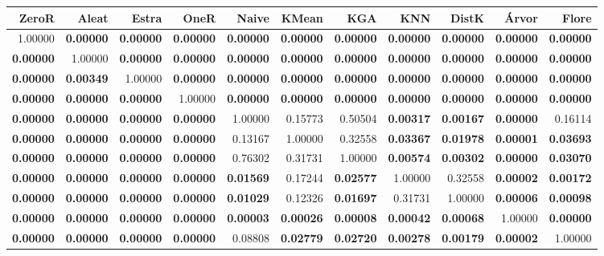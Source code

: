 \begin{table}
\centering
\label{Wineteste_pareado_table}
\begin{tabular}{rrrrrrrrrrr}
\toprule
           ZeroR &            Aleat &            Estra &            OneR  &            Naive &            KMean &              KGA &              KNN &            DistK &            Árvor &            Flore \\
\midrule
         1.00000 & \textbf{0.00000} & \textbf{0.00000} & \textbf{0.00000} & \textbf{0.00000} & \textbf{0.00000} & \textbf{0.00000} & \textbf{0.00000} & \textbf{0.00000} & \textbf{0.00000} & \textbf{0.00000} \\
\textbf{0.00000} &          1.00000 & \textbf{0.00000} & \textbf{0.00000} & \textbf{0.00000} & \textbf{0.00000} & \textbf{0.00000} & \textbf{0.00000} & \textbf{0.00000} & \textbf{0.00000} & \textbf{0.00000} \\
\textbf{0.00000} & \textbf{0.00349} &          1.00000 & \textbf{0.00000} & \textbf{0.00000} & \textbf{0.00000} & \textbf{0.00000} & \textbf{0.00000} & \textbf{0.00000} & \textbf{0.00000} & \textbf{0.00000} \\
\textbf{0.00000} & \textbf{0.00000} & \textbf{0.00000} &          1.00000 & \textbf{0.00000} & \textbf{0.00000} & \textbf{0.00000} & \textbf{0.00000} & \textbf{0.00000} & \textbf{0.00000} & \textbf{0.00000} \\
\textbf{0.00000} & \textbf{0.00000} & \textbf{0.00000} & \textbf{0.00000} &          1.00000 &          0.15773 &          0.50504 & \textbf{0.00317} & \textbf{0.00167} & \textbf{0.00000} &          0.16114 \\
\textbf{0.00000} & \textbf{0.00000} & \textbf{0.00000} & \textbf{0.00000} &          0.13167 &          1.00000 &          0.32558 & \textbf{0.03367} & \textbf{0.01978} & \textbf{0.00001} & \textbf{0.03693} \\
\textbf{0.00000} & \textbf{0.00000} & \textbf{0.00000} & \textbf{0.00000} &          0.76302 &          0.31731 &          1.00000 & \textbf{0.00574} & \textbf{0.00302} & \textbf{0.00000} & \textbf{0.03070} \\
\textbf{0.00000} & \textbf{0.00000} & \textbf{0.00000} & \textbf{0.00000} & \textbf{0.01569} &          0.17244 & \textbf{0.02577} &          1.00000 &          0.32558 & \textbf{0.00002} & \textbf{0.00172} \\
\textbf{0.00000} & \textbf{0.00000} & \textbf{0.00000} & \textbf{0.00000} & \textbf{0.01029} &          0.12326 & \textbf{0.01697} &          0.31731 &          1.00000 & \textbf{0.00006} & \textbf{0.00098} \\
\textbf{0.00000} & \textbf{0.00000} & \textbf{0.00000} & \textbf{0.00000} & \textbf{0.00003} & \textbf{0.00026} & \textbf{0.00008} & \textbf{0.00042} & \textbf{0.00068} &          1.00000 & \textbf{0.00000} \\
\textbf{0.00000} & \textbf{0.00000} & \textbf{0.00000} & \textbf{0.00000} &          0.08808 & \textbf{0.02779} & \textbf{0.02720} & \textbf{0.00278} & \textbf{0.00179} & \textbf{0.00002} &          1.00000 \\
\bottomrule
\end{tabular}
\end{table}
